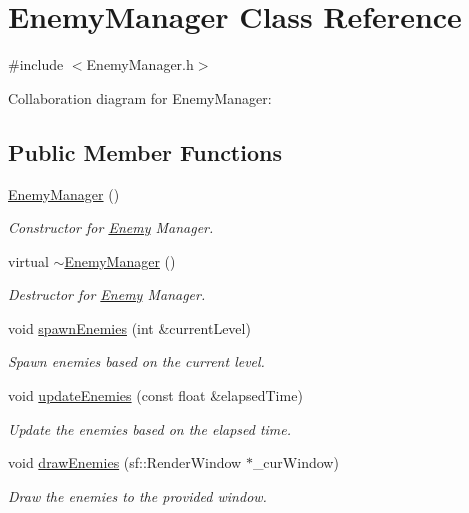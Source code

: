 \hypertarget{class_enemy_manager}{}\section{Enemy\+Manager Class Reference}
\label{class_enemy_manager}


{\ttfamily \#include $<$Enemy\+Manager.\+h$>$}



Collaboration diagram for Enemy\+Manager\+:
\subsection*{Public Member Functions}
\begin{DoxyCompactItemize}
\item 
\hyperlink{class_enemy_manager_ae8d3abb80956df199094432e49ca0d13}{Enemy\+Manager} ()
\begin{DoxyCompactList}\small\item\em Constructor for \hyperlink{class_enemy}{Enemy} Manager. \end{DoxyCompactList}\item 
virtual \hyperlink{class_enemy_manager_afe3583e45273d5509e59467d06a3feb6}{$\sim$\+Enemy\+Manager} ()
\begin{DoxyCompactList}\small\item\em Destructor for \hyperlink{class_enemy}{Enemy} Manager. \end{DoxyCompactList}\item 
void \hyperlink{class_enemy_manager_a37036db8aad73493103815dc45c6339d}{spawn\+Enemies} (int \&current\+Level)
\begin{DoxyCompactList}\small\item\em Spawn enemies based on the current level. \end{DoxyCompactList}\item 
void \hyperlink{class_enemy_manager_a8a3caf890d121478e41dcc192a8aa4a2}{update\+Enemies} (const float \&elapsed\+Time)
\begin{DoxyCompactList}\small\item\em Update the enemies based on the elapsed time. \end{DoxyCompactList}\item 
void \hyperlink{class_enemy_manager_af740dd63780a06fde9a5dd72330624da}{draw\+Enemies} (sf\+::\+Render\+Window $\ast$\+\_\+cur\+Window)
\begin{DoxyCompactList}\small\item\em Draw the enemies to the provided window. \end{DoxyCompactList}\item 

\end{DoxyCompactItemize}
